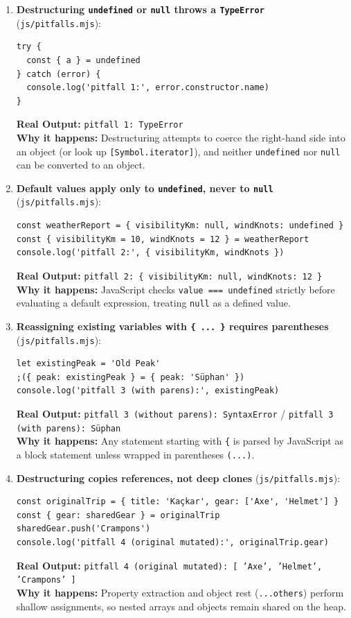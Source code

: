 \documentclass[11pt, a4paper]{article}
\begin{document}
\begin{enumerate}
  \item \textbf{Destructuring \texttt{undefined} or \texttt{null} throws a \texttt{TypeError}} (\texttt{js/pitfalls.mjs}):
\begin{lstlisting}
try {
  const { a } = undefined
} catch (error) {
  console.log('pitfall 1:', error.constructor.name)
}
\end{lstlisting}
  \textbf{Real Output:} \texttt{pitfall 1: TypeError}\\
  \textbf{Why it happens:} Destructuring attempts to coerce the right-hand side into an object (or look up \texttt{[Symbol.iterator]}), and neither \texttt{undefined} nor \texttt{null} can be converted to an object.

  \item \textbf{Default values apply only to \texttt{undefined}, never to \texttt{null}} (\texttt{js/pitfalls.mjs}):
\begin{lstlisting}
const weatherReport = { visibilityKm: null, windKnots: undefined }
const { visibilityKm = 10, windKnots = 12 } = weatherReport
console.log('pitfall 2:', { visibilityKm, windKnots })
\end{lstlisting}
  \textbf{Real Output:} \texttt{pitfall 2: \{ visibilityKm: null, windKnots: 12 \}}\\
  \textbf{Why it happens:} JavaScript checks \texttt{value === undefined} strictly before evaluating a default expression, treating \texttt{null} as a defined value.

  \item \textbf{Reassigning existing variables with \texttt{\{ ... \}} requires parentheses} (\texttt{js/pitfalls.mjs}):
\begin{lstlisting}
let existingPeak = 'Old Peak'
;({ peak: existingPeak } = { peak: 'Süphan' })
console.log('pitfall 3 (with parens):', existingPeak)
\end{lstlisting}
  \textbf{Real Output:} \texttt{pitfall 3 (without parens): SyntaxError} / \texttt{pitfall 3 (with parens): Süphan}\\
  \textbf{Why it happens:} Any statement starting with \texttt{\{} is parsed by JavaScript as a block statement unless wrapped in parentheses \texttt{(...)}.

  \item \textbf{Destructuring copies references, not deep clones} (\texttt{js/pitfalls.mjs}):
\begin{lstlisting}
const originalTrip = { title: 'Kaçkar', gear: ['Axe', 'Helmet'] }
const { gear: sharedGear } = originalTrip
sharedGear.push('Crampons')
console.log('pitfall 4 (original mutated):', originalTrip.gear)
\end{lstlisting}
  \textbf{Real Output:} \texttt{pitfall 4 (original mutated): [ 'Axe', 'Helmet', 'Crampons' ]}\\
  \textbf{Why it happens:} Property extraction and object rest (\texttt{...others}) perform shallow assignments, so nested arrays and objects remain shared on the heap.


\end{enumerate}
\end{document}
